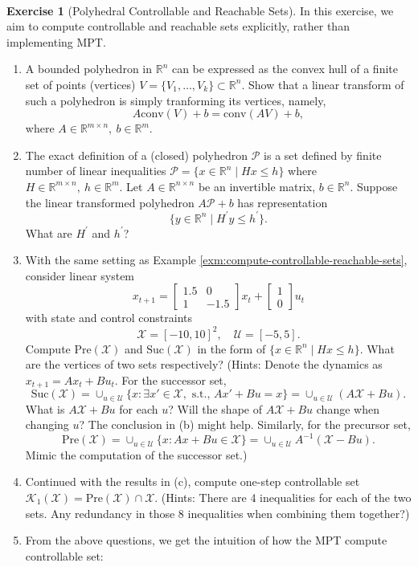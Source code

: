 \documentclass[
]{book}
\theoremstyle{definition}
\theoremstyle{definition}
\theoremstyle{definition}
\newtheorem{exercise}{Exercise}[chapter]
\theoremstyle{definition}
\theoremstyle{remark}
\begin{document}
~

\begin{exercise}[Polyhedral Controllable and Reachable Sets]
\protect\hypertarget{exr:polyhedral}{}\label{exr:polyhedral}In this exercise, we aim to compute controllable and reachable sets explicitly, rather than implementing MPT.

\begin{enumerate}
\def\labelenumi{\alph{enumi}.}
\item
  A bounded polyhedron in \(\mathbb{R}^n\) can be expressed as the convex hull of a finite set of points (vertices) \(V = \{V_1, \ldots, V_k\}\subset \mathbb{R}^n\). Show that a linear transform of such a polyhedron is simply tranforming its vertices, namely, \[A\text{conv}(V)+b = \text{conv}(AV)+b,\] where \(A\in\mathbb{R}^{m\times n},\ b\in\mathbb{R}^m\).
\item
  The exact definition of a (closed) polyhedron \(\mathcal{P}\) is a set defined by finite number of linear inequalities \(\mathcal{P} = \{x\in\mathbb{R}^n\mid Hx\le h \}\) where \(H\in\mathbb{R}^{m\times n},\ h\in\mathbb{R}^m\). Let \(A\in\mathbb{R}^{n\times n}\) be an invertible matrix, \(b\in\mathbb{R}^n\). Suppose the linear transformed polyhedron \(A\mathcal{P}+b\) has representation \[\{y\in\mathbb{R}^n\mid H^\prime y\le h^\prime \}.\] What are \(H^\prime\) and \(h^\prime\)?
\item
  With the same setting as Example \ref{exm:compute-controllable-reachable-sets}, consider linear system
  \[
  x_{t+1} = \begin{bmatrix} 1.5 & 0 \\ 1 & -1.5 \end{bmatrix} x_t + \begin{bmatrix} 1 \\ 0 \end{bmatrix} u_t
  \]
  with state and control constraints
  \[
  \mathcal{X} = [-10,10]^2, \quad \mathcal{U} = [-5,5].
  \]
  Compute \(\text{Pre}(\mathcal{X})\) and \(\text{Suc}(\mathcal{X})\) in the form of \(\{x\in\mathbb{R}^n\mid Hx\le h \}\). What are the vertices of two sets respectively?
  (Hints: Denote the dynamics as \(x_{t+1} = Ax_t+Bu_t\). For the successor set, \[\text{Suc}(\mathcal{X}) = \cup_{u\in\mathcal{U}}\{x:\exists x'\in\mathcal{X},\text{ s.t., }Ax'+Bu = x\} = \cup_{u\in\mathcal{U}}(A\mathcal{X} + Bu).\]
  What is \(A\mathcal{X} + Bu\) for each \(u\)? Will the shape of \(A\mathcal{X} + Bu\) change when changing \(u\)? The conclusion in (b) might help.
  Similarly, for the precursor set,
  \[\text{Pre}(\mathcal{X}) = \cup_{u\in\mathcal{U}}\{x:Ax+Bu \in \mathcal{X}\} = \cup_{u\in\mathcal{U}}A^{-1}(\mathcal{X} - Bu).\]
  Mimic the computation of the successor set.)
\item
  Continued with the results in (c), compute one-step controllable set \(\mathcal{K}_1(\mathcal{X}) = \text{Pre}(\mathcal{X}) \cap \mathcal{X}\).
  (Hints: There are 4 inequalities for each of the two sets. Any redundancy in those 8 inequalities when combining them together?)
\item
  From the above questions, we get the intuition of how the MPT compute controllable set:
\end{enumerate}


\end{exercise}
\end{document}
